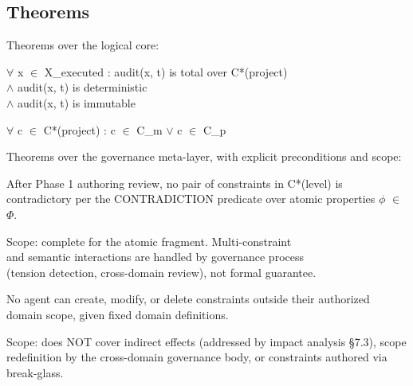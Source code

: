 \subsection{Theorems}
\label{sec:formal-model-A-1-13}


Theorems over the logical core:

\begin{cthm}
\begin{claddisp}
$\forall$ x $\in$ X\_executed : audit(x, t) is total over C*(project)\\
$\wedge$ audit(x, t) is deterministic\\
$\wedge$ audit(x, t) is immutable\\
\end{claddisp}
\end{cthm}

\begin{cthm}
\begin{claddisp}
$\forall$ c $\in$ C*(project) : c $\in$ C\_m $\vee$ c $\in$ C\_p\\
\end{claddisp}
\end{cthm}


Theorems over the governance meta-layer, with explicit preconditions and scope:

\begin{cthm}
After Phase 1 authoring review, no pair of constraints in
C*(level) is contradictory per the CONTRADICTION predicate over atomic properties $\phi$ $\in$ $\Phi$.

\begin{claddisp}
Scope: complete for the atomic fragment. Multi-constraint\\
and semantic interactions are handled by governance process\\
(tension detection, cross-domain review), not formal guarantee.\\
\end{claddisp}
\end{cthm}

\begin{cthm}
No agent can create, modify, or delete constraints outside their authorized domain scope, given fixed domain definitions.

Scope: does NOT cover indirect effects (addressed by impact analysis \S{}7.3), scope redefinition by the cross-domain governance body, or constraints authored via break-glass.

\end{cthm}

